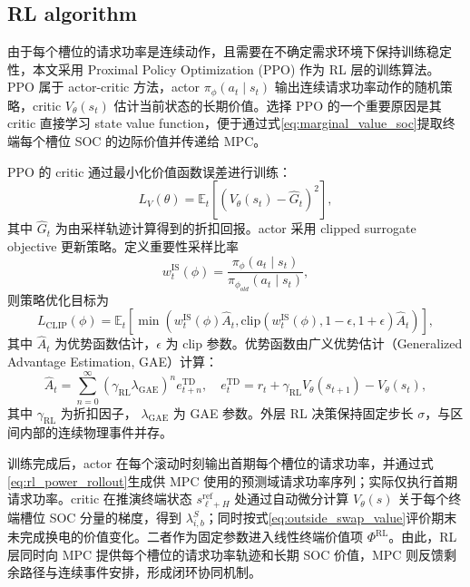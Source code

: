 \documentclass[12pt,a4paper,UTF8]{ctexart}
\begin{document}
\subsection{RL algorithm}

由于每个槽位的请求功率是连续动作，且需要在不确定需求环境下保持训练稳定性，本文采用 Proximal Policy Optimization (PPO) 作为 RL 层的训练算法。PPO 属于 actor-critic 方法，actor $\pi_{\phi}(a_t\mid s_t)$ 输出连续请求功率动作的随机策略，critic $V_{\theta}(s_t)$ 估计当前状态的长期价值。选择 PPO 的一个重要原因是其 critic 直接学习 state value function，便于通过式\eqref{eq:marginal_value_soc}提取终端每个槽位 SOC 的边际价值并传递给 MPC。

PPO 的 critic 通过最小化价值函数误差进行训练：
\begin{equation}
L_V(\theta)=
\mathbb{E}_t\left[
\left(V_{\theta}(s_t)-\hat{G}_t\right)^2
\right],
\label{eq:value_loss}
\end{equation}
其中 $\hat{G}_t$ 为由采样轨迹计算得到的折扣回报。actor 采用 clipped surrogate objective 更新策略。定义重要性采样比率
\begin{equation}
w_t^{\mathrm{IS}}(\phi)=
\frac{\pi_{\phi}(a_t\mid s_t)}{\pi_{\phi_{old}}(a_t\mid s_t)},
\label{eq:ppo_ratio}
\end{equation}
则策略优化目标为
\begin{equation}
L_{\mathrm{CLIP}}(\phi)=
\mathbb{E}_t\left[
\min\left(
w_t^{\mathrm{IS}}(\phi)\hat{A}_t,
\mathrm{clip}(w_t^{\mathrm{IS}}(\phi),1-\epsilon,1+\epsilon)\hat{A}_t
\right)
\right],
\label{eq:ppo_clip}
\end{equation}
其中 $\hat{A}_t$ 为优势函数估计，$\epsilon$ 为 clip 参数。优势函数由广义优势估计（Generalized Advantage Estimation, GAE）计算：
\begin{equation}
\hat{A}_t=\sum_{n=0}^{\infty}
(\gamma_{\mathrm{RL}}\lambda_{\mathrm{GAE}})^n
e_{t+n}^{\mathrm{TD}},
\quad
e_t^{\mathrm{TD}}=r_t
+\gamma_{\mathrm{RL}}V_{\theta}(s_{t+1})-V_{\theta}(s_t),
\label{eq:gae}
\end{equation}
其中 $\gamma_{\mathrm{RL}}$ 为折扣因子，
$\lambda_{\mathrm{GAE}}$ 为 GAE 参数。外层 RL 决策保持固定步长 $\sigma$，与区间内部的连续物理事件并存。

训练完成后，actor 在每个滚动时刻输出首期每个槽位的请求功率，并通过式\eqref{eq:rl_power_rollout}生成供 MPC 使用的预测域请求功率序列；实际仅执行首期请求功率。critic 在推演终端状态 $s_{\ell+H}^{\mathrm{ref}}$ 处通过自动微分计算 $V_{\theta}(s)$ 关于每个终端槽位 SOC 分量的梯度，得到 $\lambda^S_{i,b}$；同时按式\eqref{eq:outside_swap_value}评价期末未完成换电的价值变化。二者作为固定参数进入线性终端价值项 $\Phi^{\mathrm{RL}}$。由此，RL 层同时向 MPC 提供每个槽位的请求功率轨迹和长期 SOC 价值，MPC 则反馈剩余路径与连续事件安排，形成闭环协同机制。
\end{document}
